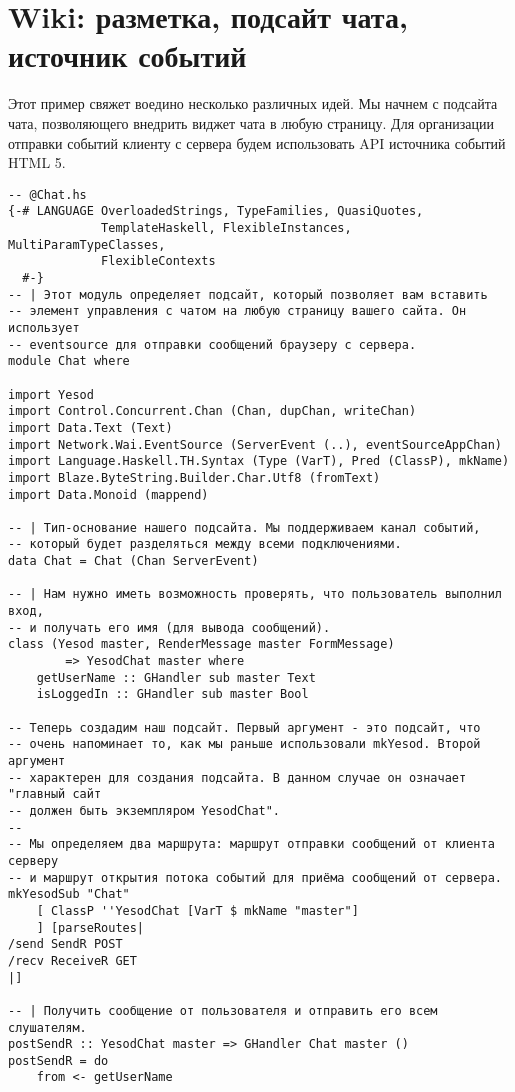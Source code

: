 
\chapter{Wiki: разметка, подсайт чата, источник событий}
\label{}

Этот пример свяжет воедино несколько различных идей. Мы начнем с подсайта чата, позволяющего внедрить виджет чата в любую страницу. Для организации отправки событий клиенту с сервера будем использовать API источника событий HTML 5.

\begin{lstlisting}
-- @Chat.hs
{-# LANGUAGE OverloadedStrings, TypeFamilies, QuasiQuotes,
             TemplateHaskell, FlexibleInstances, MultiParamTypeClasses,
             FlexibleContexts
  #-}
-- | Этот модуль определяет подсайт, который позволяет вам вставить
-- элемент управления с чатом на любую страницу вашего сайта. Он использует
-- eventsource для отправки сообщений браузеру с сервера.
module Chat where

import Yesod
import Control.Concurrent.Chan (Chan, dupChan, writeChan)
import Data.Text (Text)
import Network.Wai.EventSource (ServerEvent (..), eventSourceAppChan)
import Language.Haskell.TH.Syntax (Type (VarT), Pred (ClassP), mkName)
import Blaze.ByteString.Builder.Char.Utf8 (fromText)
import Data.Monoid (mappend)

-- | Тип-основание нашего подсайта. Мы поддерживаем канал событий,
-- который будет разделяться между всеми подключениями.
data Chat = Chat (Chan ServerEvent)

-- | Нам нужно иметь возможность проверять, что пользователь выполнил вход,
-- и получать его имя (для вывода сообщений).
class (Yesod master, RenderMessage master FormMessage)
        => YesodChat master where
    getUserName :: GHandler sub master Text
    isLoggedIn :: GHandler sub master Bool

-- Теперь создадим наш подсайт. Первый аргумент - это подсайт, что
-- очень напоминает то, как мы раньше использовали mkYesod. Второй аргумент
-- характерен для создания подсайта. В данном случае он означает "главный сайт
-- должен быть экземпляром YesodChat".
--
-- Мы определяем два маршрута: маршрут отправки сообщений от клиента серверу
-- и маршрут открытия потока событий для приёма сообщений от сервера.
mkYesodSub "Chat"
    [ ClassP ''YesodChat [VarT $ mkName "master"]
    ] [parseRoutes|
/send SendR POST
/recv ReceiveR GET
|]

-- | Получить сообщение от пользователя и отправить его всем слушателям.
postSendR :: YesodChat master => GHandler Chat master ()
postSendR = do
    from <- getUserName


\end{lstlisting}
